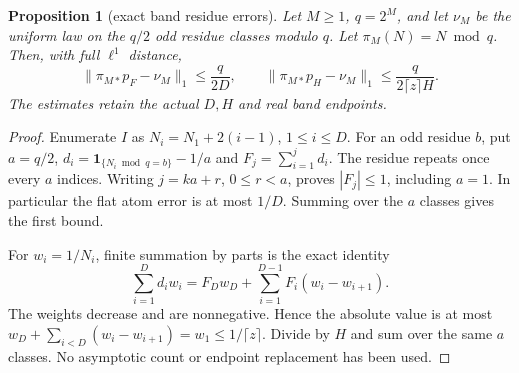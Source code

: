 \documentclass[11pt]{article}
\newtheorem{proposition}{Proposition}
\theoremstyle{remark}\newtheorem{remark}[proposition]{Remark}
\begin{document}
\begin{proposition}[exact band residue errors]
\label{prop:mazur-band-residues}
Let $M\ge1$, $q=2^M$, and let $\nu_M$ be the uniform law on the
$q/2$ odd residue classes modulo $q$. Let $\pi_M(N)=N\bmod q$.
Then, with full $\ell^1$ distance,
\begin{equation}
 \|\pi_{M*}p_F-\nu_M\|_1\le\frac{q}{2D},\qquad
 \|\pi_{M*}p_H-\nu_M\|_1\le\frac{q}{2\lceil z\rceil H}.
 \label{eq:mazur-band-residues}
\end{equation}
The estimates retain the actual $D,H$ and real band endpoints.
\end{proposition}
\begin{proof}
Enumerate $I$ as $N_i=N_1+2(i-1)$, $1\le i\le D$.
For an odd residue $b$, put $a=q/2$,
$d_i=\mathbf1_{\{N_i\bmod q=b\}}-1/a$ and
$F_j=\sum_{i=1}^j d_i$. The residue repeats once every $a$ indices.
Writing $j=ka+r$, $0\le r<a$, proves $|F_j|\le1$,
including $a=1$. In particular the flat atom error is at most $1/D$.
Summing over the $a$ classes gives the first bound.

For $w_i=1/N_i$, finite summation by parts is the exact identity
\[
 \sum_{i=1}^D d_iw_i
 =F_Dw_D+\sum_{i=1}^{D-1}F_i(w_i-w_{i+1}).
\]
The weights decrease and are nonnegative. Hence the absolute value
is at most $w_D+\sum_{i<D}(w_i-w_{i+1})=w_1
\le1/\lceil z\rceil$. Divide by $H$ and sum over the same $a$
classes. No asymptotic count or endpoint replacement has been used.
\end{proof}
\end{document}

